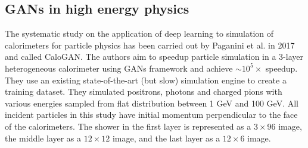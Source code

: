 




\subsection{GANs in high energy physics}
The  systematic study on the application of deep learning to simulation of calorimeters for particle physics has been carried out by Paganini et al. in 2017 \cite{paganini2017calogan} and called CaloGAN. The authors aim to speedup particle simulation in a 3-layer heterogeneous calorimeter  using GANs framework and achieve $\sim 10^5 \times$ speedup. They use an existing state-of-the-art (but slow) simulation engine \geant to create a training dataset. They simulated positrons, photons and charged pions with various energies sampled from flat distribution between 1 GeV and 100 GeV. All incident particles in this study have initial momentum perpendicular to the face of the calorimeters. The shower in the first layer is represented as a $3 \times 96$ image, the middle layer as a $12 \times 12$ image, and the last layer as a $12 \times 6$ image. 

